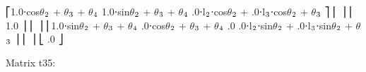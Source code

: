 \documentclass[letterpaper,10pt,english,openany,oneside]{sphinxmanual}
\begin{document}
\begin{sphinxVerbatim}[commandchars=\\\{\}]
⎡1.0⋅cos\(\theta\)\(\sb{\text{2}}\) + \(\theta\)\(\sb{\text{3}}\) + \(\theta\)\(\sb{\text{4}}\)  \PYGZhy{}1.0⋅sin\(\theta\)\(\sb{\text{2}}\) + \(\theta\)\(\sb{\text{3}}\) + \(\theta\)\(\sb{\text{4}}\)       .0⋅l\(\sb{\text{2}}\)⋅cos\(\theta\)\(\sb{\text{2}}\) + .0⋅l\(\sb{\text{3}}\)⋅cos\(\theta\)\(\sb{\text{2}}\) + \(\theta\)\(\sb{\text{3}}\)   ⎤
⎢                                                                                         ⎥
⎢                                             \PYGZhy{}1.0                                     ⎥
⎢                                                                                         ⎥
⎢1.0⋅sin\(\theta\)\(\sb{\text{2}}\) + \(\theta\)\(\sb{\text{3}}\) + \(\theta\)\(\sb{\text{4}}\)  .0⋅cos\(\theta\)\(\sb{\text{2}}\) + \(\theta\)\(\sb{\text{3}}\) + \(\theta\)\(\sb{\text{4}}\)   .0   .0⋅l\(\sb{\text{2}}\)⋅sin\(\theta\)\(\sb{\text{2}}\) + .0⋅l\(\sb{\text{3}}\)⋅sin\(\theta\)\(\sb{\text{2}}\) + \(\theta\)\(\sb{\text{3}}\)   ⎥
⎢                                                                                         ⎥
⎣                                                                  .0                 ⎦


Matrix t\PYGZus{}3\PYGZus{}5:


\end{sphinxVerbatim}
\end{document}
